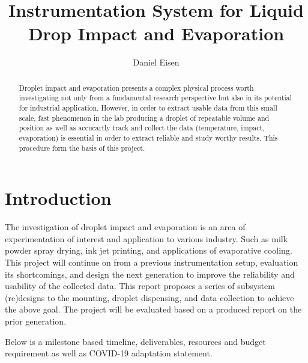 \documentclass[11pt, a4paper, twoside, openright]{report}
\title{Instrumentation System for Liquid Drop Impact and Evaporation}
\author{Daniel Eisen}
\date{}
\begin{document}
\frontmatter


\begin{abstract}
  Droplet impact and evaporation presents a complex physical process worth investigating not only from a fundamental research perspective but also in its potential for industrial application. However, in order to extract usable data from this small scale, fast phenomenon in the lab producing a droplet of repeatable volume and position as well as accucartly track and collect the data (temperature, impact, evaporation) is essential in order to extract reliable and study worthy results. This procedure form the basis of this project.
\end{abstract}


\maketitle
\tableofcontents



\mainmatter


\section{Introduction}
The investigation of droplet impact and evaporation is an area of experimentation of interest and application to various industry. Such as milk powder spray drying, ink jet printing, and applications of evaporative cooling.
This project will continue on from a previous instrumentation setup, evaluation its shortcomings, and design the next generation to improve the reliability and usability of the collected data. 
This report proposes a series of subsystem (re)designs to the mounting, droplet dispensing, and data collection to achieve the above goal. The project will be evaluated based on a produced report on the prior generation.

Below is a milestone based timeline, deliverables, resources and budget requirement as well as COVID-19 adaptation statement.
\end{document}

